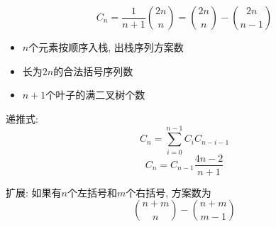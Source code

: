 $$C_n = \frac 1 {n + 1}{2n\choose n} = {2n \choose n} - {2n \choose n - 1}$$

\begin{itemize}
	\item $n$个元素按顺序入栈, 出栈序列方案数
	\item 长为$2n$的合法括号序列数
	\item $n + 1$个叶子的满二叉树个数
\end{itemize}

递推式: 
$$C_n = \sum_{i = 0} ^ {n - 1} C_i C_{n - i - 1}$$
$$C_n = C_{n - 1} \frac {4n - 2} {n + 1}$$

扩展: 如果有$n$个左括号和$m$个右括号, 方案数为
$${n + m \choose n} - {n + m \choose m - 1}$$